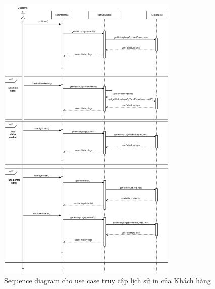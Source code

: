 \begin{figure}[H]
    \begin{center}
        \includegraphics[width=0.77\textwidth]{Images/System Modelling/Logging(customer)_Sequence.png}
        \caption{Sequence diagram cho use case truy cập lịch sử in của Khách hàng}
        \label{fig:arch}
    \end{center}
\end{figure}

